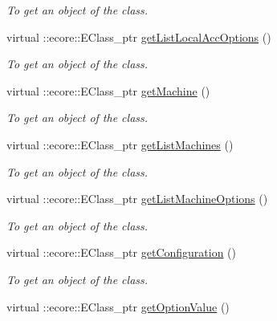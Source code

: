 \begin{DoxyCompactItemize}
\begin{DoxyCompactList}\small\item\em To get an object of the class. \item\end{DoxyCompactList}\item 
virtual ::ecore::EClass\_\-ptr \hyperlink{classUMS__Data_1_1UMS__DataPackage_ad85d09270614535d06ea3137f77fb1fd}{getListLocalAccOptions} ()
\begin{DoxyCompactList}\small\item\em To get an object of the class. \item\end{DoxyCompactList}\item 
virtual ::ecore::EClass\_\-ptr \hyperlink{classUMS__Data_1_1UMS__DataPackage_aaffe5f970c6c08c148c98151cef8c3ae}{getMachine} ()
\begin{DoxyCompactList}\small\item\em To get an object of the class. \item\end{DoxyCompactList}\item 
virtual ::ecore::EClass\_\-ptr \hyperlink{classUMS__Data_1_1UMS__DataPackage_a2c26c1e08733ff16f79303674afe405c}{getListMachines} ()
\begin{DoxyCompactList}\small\item\em To get an object of the class. \item\end{DoxyCompactList}\item 
virtual ::ecore::EClass\_\-ptr \hyperlink{classUMS__Data_1_1UMS__DataPackage_a9d836f390267a5e471f066c5430f94d5}{getListMachineOptions} ()
\begin{DoxyCompactList}\small\item\em To get an object of the class. \item\end{DoxyCompactList}\item 
virtual ::ecore::EClass\_\-ptr \hyperlink{classUMS__Data_1_1UMS__DataPackage_a6014ba45dfe5c650be5583ca73f07a24}{getConfiguration} ()
\begin{DoxyCompactList}\small\item\em To get an object of the class. \item\end{DoxyCompactList}\item 
virtual ::ecore::EClass\_\-ptr \hyperlink{classUMS__Data_1_1UMS__DataPackage_a1404b4508b82a2e60ed6db35d39341ea}{getOptionValue} ()

\end{DoxyCompactItemize}
